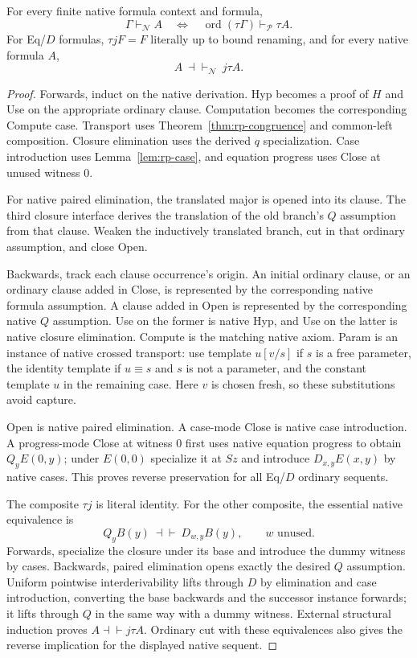 \begin{theorem}
For every finite native formula context and formula,
\[
 \Gamma\vdash_{\mathcal N}A
 \quad\Longleftrightarrow\quad
 \operatorname{ord}(\tau\Gamma)\vdash_{\mathcal P}\tau A.
\]
For Eq/$D$ formulas, $\tau jF=F$ literally up to bound renaming, and
for every native formula $A$,
\[
 A\ \dashv\vdash_{\mathcal N}\ j\tau A.
\]
\end{theorem}
\begin{proof}
Forwards, induct on the native derivation.  Hyp becomes a proof of $H$
and Use on the appropriate ordinary clause.  Computation becomes the
corresponding Compute case.  Transport uses
Theorem~\ref{thm:rp-congruence} and common-left composition.
Closure elimination uses the derived $q$ specialization.  Case
introduction uses Lemma~\ref{lem:rp-case}, and equation progress uses
Close at unused witness $0$.

For native paired elimination, the translated major is opened into its
clause.  The third closure interface derives the translation of the old
branch's $Q$ assumption from that clause.  Weaken the inductively
translated branch, cut in that ordinary assumption, and close Open.

Backwards, track each clause occurrence's origin.  An initial ordinary
clause, or an ordinary clause added in Close, is represented by the
corresponding native formula assumption.  A clause added in Open is
represented by the corresponding native $Q$ assumption.  Use on the
former is native Hyp, and Use on the latter is native closure elimination.
Compute is the matching native axiom.  Param is an instance of native
crossed transport: use template $u[v/s]$ if $s$ is a free parameter,
the identity template if $u\equiv s$ and $s$ is not a parameter, and
the constant template $u$ in the remaining case.  Here $v$ is chosen
fresh, so these substitutions avoid capture.

Open is native paired elimination.  A case-mode Close is native case
introduction.  A progress-mode Close at witness $0$ first uses native
equation progress to obtain $Q_yE(0,y)$; under $E(0,0)$ specialize it at
$Sz$ and introduce $D_{x,y}E(x,y)$ by native cases.  This proves reverse
preservation for all Eq/$D$ ordinary sequents.

The composite $\tau j$ is literal identity.  For the other composite,
the essential native equivalence is
\[
 Q_yB(y)\ \dashv\vdash\ D_{w,y}B(y),\qquad w\text{ unused}.
\]
Forwards, specialize the closure under its base and introduce the dummy
witness by cases.  Backwards, paired elimination opens exactly the
desired $Q$ assumption.  Uniform pointwise interderivability lifts
through $D$ by elimination and case introduction, converting the base
backwards and the successor instance forwards; it lifts through $Q$
in the same way with a dummy witness.  External structural induction
proves $A\dashv\vdash j\tau A$.  Ordinary cut with these equivalences
also gives the reverse implication for the displayed native sequent.
\end{proof}

